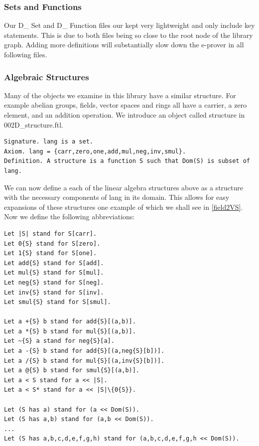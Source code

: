 \documentclass[11pt]{article}
\begin{document}
\subsubsection{Sets and Functions}

Our D\_ Set and D\_ Function files our kept very lightweight and only include key statements. This is due to both files being so close to the root node of the library graph. Adding more definitions will substantially slow down the e-prover in all following files.

\subsubsection{Algebraic Structures}
Many of the objects we examine in this library have a similar structure. For example abelian groups, fields, vector spaces and rings all have a carrier, a zero element, and an addition operation. We introduce an object called structure in 002D\_structure.ftl.
\begin{lstlisting}
Signature. lang is a set.
Axiom. lang = {carr,zero,one,add,mul,neg,inv,smul}.
Definition. A structure is a function S such that Dom(S) is subset of lang.
\end{lstlisting}


We can now define a each of the linear algebra structures above as a structure with the necessary components of {\ftl lang} in its domain. This allows for easy expansions of these structures one example of which we shall see in \ref{field2VS}. Now we define the following abbreviations:
\begin{lstlisting}
Let |S| stand for S[carr].
Let 0{S} stand for S[zero].
Let 1{S} stand for S[one].
Let add{S} stand for S[add].
Let mul{S} stand for S[mul].
Let neg{S} stand for S[neg].
Let inv{S} stand for S[inv].
Let smul{S} stand for S[smul].

Let a +{S} b stand for add{S}[(a,b)].
Let a *{S} b stand for mul{S}[(a,b)].
Let ~{S} a stand for neg{S}[a].
Let a -{S} b stand for add{S}[(a,neg{S}[b])].
Let a /{S} b stand for mul{S}[(a,inv{S}[b])].
Let a @{S} b stand for smul{S}[(a,b)].
Let a < S stand for a << |S|.
Let a < S* stand for a << |S|\{0{S}}.

Let (S has a) stand for (a << Dom(S)).
Let (S has a,b) stand for (a,b << Dom(S)).
...
Let (S has a,b,c,d,e,f,g,h) stand for (a,b,c,d,e,f,g,h << Dom(S)).
\end{lstlisting}
\end{document}

